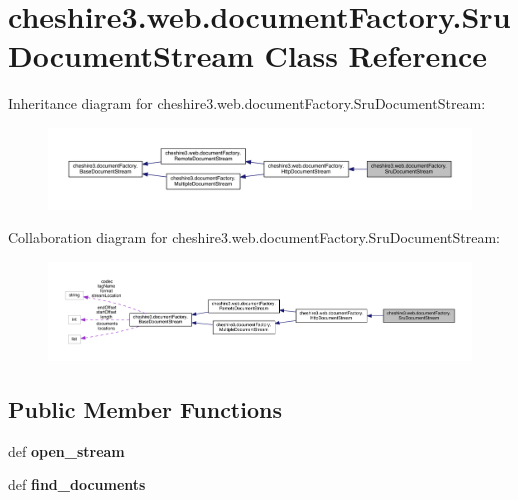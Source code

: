 \hypertarget{classcheshire3_1_1web_1_1document_factory_1_1_sru_document_stream}{\section{cheshire3.\-web.\-document\-Factory.\-Sru\-Document\-Stream Class Reference}
\label{classcheshire3_1_1web_1_1document_factory_1_1_sru_document_stream}
}


Inheritance diagram for cheshire3.\-web.\-document\-Factory.\-Sru\-Document\-Stream\-:
\nopagebreak
\begin{figure}[H]
\begin{center}
\leavevmode
\includegraphics[width=350pt]{classcheshire3_1_1web_1_1document_factory_1_1_sru_document_stream__inherit__graph}
\end{center}
\end{figure}


Collaboration diagram for cheshire3.\-web.\-document\-Factory.\-Sru\-Document\-Stream\-:
\nopagebreak
\begin{figure}[H]
\begin{center}
\leavevmode
\includegraphics[width=350pt]{classcheshire3_1_1web_1_1document_factory_1_1_sru_document_stream__coll__graph}
\end{center}
\end{figure}
\subsection*{Public Member Functions}
\begin{DoxyCompactItemize}
\item 
\hypertarget{classcheshire3_1_1web_1_1document_factory_1_1_sru_document_stream_a19779a46cc67f04509b290d976bb77de}{def {\bfseries open\-\_\-stream}}\label{classcheshire3_1_1web_1_1document_factory_1_1_sru_document_stream_a19779a46cc67f04509b290d976bb77de}

\item 
\hypertarget{classcheshire3_1_1web_1_1document_factory_1_1_sru_document_stream_a4c02d947bcf51d9993f9d8d642fdebb2}{def {\bfseries find\-\_\-documents}}\label{classcheshire3_1_1web_1_1document_factory_1_1_sru_document_stream_a4c02d947bcf51d9993f9d8d642fdebb2}

\end{DoxyCompactItemize}
